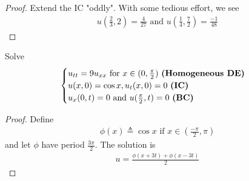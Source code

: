 \documentclass{report}
\begin{document}
\begin{proof}
Extend the IC "oddly". With some tedious effort, we see 
\begin{align*}
u(\frac{2}{3},2)=\frac{4}{27}\text{ and }u(\frac{1}{4},\frac{7}{2})= \frac{-1}{48}
\end{align*}
\end{proof}
\begin{question}{}{}
Solve 
\begin{align*}
\begin{cases}
  u_{tt}=9u_{xx} \text{ for $x\in (0, \frac{\pi}{2})$ \textbf{(Homogeneous DE)}} \\
  u(x,0)=\cos x,u_t(x,0)=0\text{ \textbf{(IC)} } \\
  u_x(0,t)=0\text{ and }u(\frac{\pi}{2},t)=0\text{ \textbf{(BC)} }
\end{cases}
\end{align*}
\end{question}
\begin{proof}
Define 
\begin{align*}
\phi (x)\triangleq \cos x\text{ if }x\in (\frac{-\pi }{2},\pi )
\end{align*}
and let $\phi$ have period $\frac{3 \pi}{2}$. The solution is 
\begin{align*}
u= \frac{\phi (x+3t)+\phi (x-3t)}{2} 
\end{align*}
\end{proof}
\end{document}
